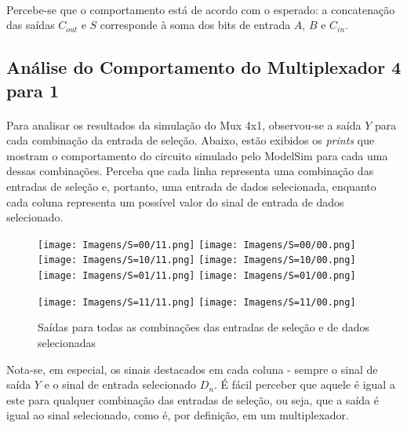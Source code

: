 \documentclass[a4paper,12pt]{article}
\begin{document}
\paragraph{}
Percebe-se que o comportamento está de acordo com o esperado: a concatenação das saídas $C_{out}$ e $S$ corresponde à soma dos bits de entrada $A$, $B$ e $C_{in}$.

\subsection{Análise do Comportamento do Multiplexador 4 para 1}

\paragraph{}
Para analisar os resultados da simulação do Mux 4x1, observou-se a saída $Y$ para cada combinação da entrada de seleção. Abaixo, estão exibidos os \textit{prints} que mostram o comportamento do circuito simulado pelo ModelSim para cada uma dessas combinações. Perceba que cada linha representa uma combinação das entradas de seleção e, portanto, uma entrada de dados selecionada, enquanto cada coluna representa um possível valor do sinal de entrada de dados selecionado.

\begin{figure}[H]
    \centering
    \texttt{[image: Imagens/S=00/11.png]}
    \texttt{[image: Imagens/S=00/00.png]} \\
    \texttt{[image: Imagens/S=10/11.png]}
    \texttt{[image: Imagens/S=10/00.png]} \\
    \texttt{[image: Imagens/S=01/11.png]}
    \texttt{[image: Imagens/S=01/00.png]}
\end{figure}
\begin{figure}[H]
    \centering
    \texttt{[image: Imagens/S=11/11.png]}
    \texttt{[image: Imagens/S=11/00.png]}
\caption{Saídas para todas as combinações das entradas de seleção e de dados selecionadas}
\end{figure}

\noindent Nota-se, em especial, os sinais destacados em cada coluna - sempre o sinal de saída $Y$ e o sinal de entrada selecionado $D_{n}$. É fácil perceber que aquele é igual a este para qualquer combinação das entradas de seleção, ou seja, que a saída é igual ao sinal selecionado, como é, por definição, em um multiplexador.
\end{document}
